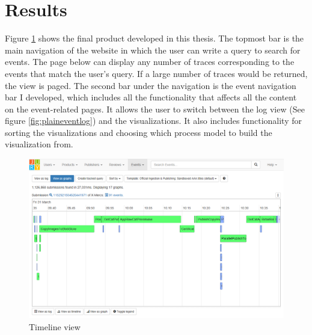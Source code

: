 


\clearpage
\section{Results}
\label{sec:results}


Figure \ref{fig:timeline} shows the final product developed in this thesis.
The topmost bar is the main navigation of the website in which the user can write a query to search for events.
The page below can display any number of traces corresponding to the events that match the user's query.
If a large number of traces would be returned, the view is paged.
The second bar under the navigation is the event navigation bar I developed, which includes all the functionality that affects all the content on the event-related pages.
It allows the user to switch between the log view (See figure \ref{fig:plaineventlog}) and the visualizations.
It also includes functionality for sorting the visualizations and choosing which process model to build the visualization from.

\begin{figure}[htb]
\centering \includegraphics[width=\linewidth]{gfx/screenshots/timeline.png}
\caption{Timeline view \label{fig:timeline}}
\end{figure}

